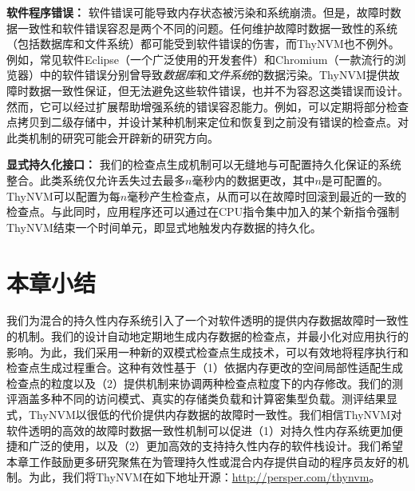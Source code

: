 \textbf{软件程序错误：}
软件错误可能导致内存状态被污染和系统崩溃。但是，故障时数据一致性和软件错误容忍是两个不同的问题。任何维护故障时数据一致性的系统（包括数据库和文件系统）都可能受到软件错误的伤害，而ThyNVM也不例外。例如，常见软件Eclipse（一个广泛使用的开发套件）和Chromium（一款流行的浏览器）中的软件错误分别曾导致\emph{数据库}和\emph{文件系统}的数据污染\cite{eclipse:bug,chrom:bug}。ThyNVM提供故障时数据一致性保证，但无法避免这些软件错误，也并不为容忍这类错误而设计。然而，它可以经过扩展帮助增强系统的错误容忍能力。例如，可以定期将部分检查点拷贝到二级存储中，并设计某种机制来定位和恢复到之前没有错误的检查点。对此类机制的研究可能会开辟新的研究方向。

\textbf{显式持久化接口：}
我们的检查点生成机制可以无缝地与可配置持久化保证的系统\cite{Ports:2010:TCA:1924943.1924963,
Cipar:2012:LTF:2168836.2168854,
Mickens:2014:BFC:2616448.2616473}整合。此类系统仅允许丢失过去最多$n$毫秒内的数据更改，其中$n$是可配置的。ThyNVM可以配置为每$n$毫秒产生检查点，从而可以在故障时回滚到最近的一致的检查点。与此同时，应用程序还可以通过在CPU指令集中加入的某个新指令强制ThyNVM结束一个时间单元，即显式地触发内存数据的持久化。


\section{本章小结}

我们为混合的持久性内存系统引入了一个对软件透明的提供内存数据故障时一致性的机制。我们的设计自动地定期地生成内存数据的检查点，并最小化对应用执行的影响。为此，我们采用一种新的双模式检查点生成技术，可以有效地将程序执行和检查点生成过程重合。这种有效性基于（1）依据内存更改的空间局部性适配生成检查点的粒度以及（2）提供机制来协调两种检查点粒度下的内存修改。我们的测评涵盖多种不同的访问模式、真实的存储类负载和计算密集型负载。测评结果显式，ThyNVM以很低的代价提供内存数据的故障时一致性。我们相信ThyNVM对软件透明的高效的故障时数据一致性机制可以促进（1）对持久性内存系统更加便捷和广泛的使用，以及（2）更加高效的支持持久性内存的软件栈设计。我们希望本章工作鼓励更多研究聚焦在为管理持久性或混合内存提供自动的程序员友好的机制。为此，我们将ThyNVM在如下地址开源：\url{http://persper.com/thynvm}。


